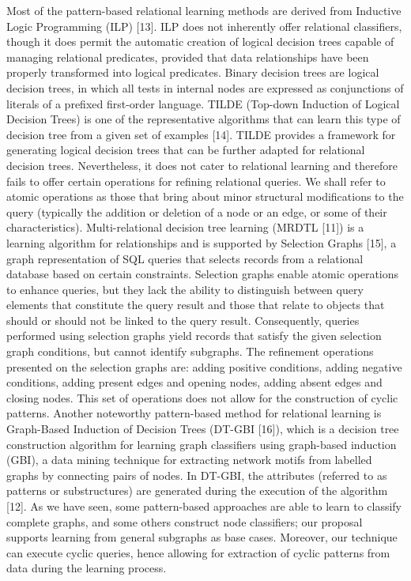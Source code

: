 \documentclass{article}%
\begin{document}
Most of the pattern{-}based relational learning methods are derived from Inductive Logic Programming (ILP) {[}13{]}. ILP does not inherently offer relational classifiers, though it does permit the automatic creation of logical decision trees capable of managing relational predicates, provided that data relationships have been properly transformed into logical predicates. Binary decision trees are logical decision trees, in which all tests in internal nodes are expressed as conjunctions of literals of a prefixed first{-}order language. TILDE (Top{-}down Induction of Logical Decision Trees) is one of the representative algorithms that can learn this type of decision tree from a given set of examples {[}14{]}. TILDE provides a framework for generating logical decision trees that can be further adapted for relational decision trees. Nevertheless, it does not cater to relational learning and therefore fails to offer certain operations for refining relational queries. We shall refer to atomic operations as those that bring about minor structural modifications to the query (typically the addition or deletion of a node or an edge, or some of their characteristics).\newline%
\newline%
Multi{-}relational decision tree learning (MRDTL {[}11{]}) is a learning algorithm for relationships and is supported by Selection Graphs {[}15{]}, a graph representation of SQL queries that selects records from a relational database based on certain constraints. Selection graphs enable atomic operations to enhance queries, but they lack the ability to distinguish between query elements that constitute the query result and those that relate to objects that should or should not be linked to the query result. Consequently, queries performed using selection graphs yield records that satisfy the given selection graph conditions, but cannot identify subgraphs. The refinement operations presented on the selection graphs are: adding positive conditions, adding negative conditions, adding present edges and opening nodes, adding absent edges and closing nodes. This set of operations does not allow for the construction of cyclic patterns.\newline%
\newline%
Another noteworthy pattern{-}based method for relational learning is Graph{-}Based Induction of Decision Trees (DT{-}GBI {[}16{]}), which is a decision tree construction algorithm for learning graph classifiers using graph{-}based induction (GBI), a data mining technique for extracting network motifs from labelled graphs by connecting pairs of nodes. In DT{-}GBI, the attributes (referred to as patterns or substructures) are generated during the execution of the algorithm {[}12{]}.\newline%
\newline%
As we have seen, some pattern{-}based approaches are able to learn to classify complete graphs, and some others construct node classifiers; our proposal supports learning from general subgraphs as base cases. Moreover, our technique can execute cyclic queries, hence allowing for extraction of cyclic patterns from data during the learning process.
\end{document}
